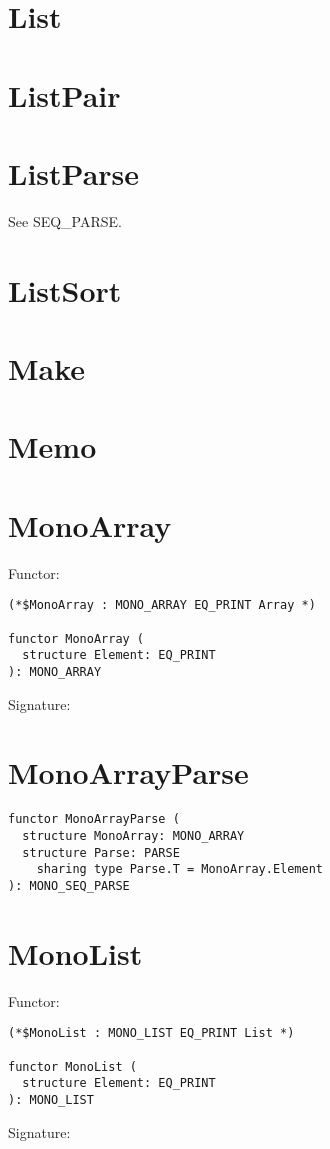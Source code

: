 \newpage
\section{List}


\newpage
\section{ListPair}


\newpage
\section{ListParse}
See SEQ\_PARSE.

\newpage
\section{ListSort}


\newpage
\section{Make}


\newpage
\section{Memo}


\newpage
\section{MonoArray}
Functor:
\begin{verbatim}
(*$MonoArray : MONO_ARRAY EQ_PRINT Array *)

functor MonoArray (
  structure Element: EQ_PRINT
): MONO_ARRAY
\end{verbatim}
\bigskip
Signature:


\newpage
\section{MonoArrayParse}
\begin{verbatim}
functor MonoArrayParse (
  structure MonoArray: MONO_ARRAY
  structure Parse: PARSE
    sharing type Parse.T = MonoArray.Element
): MONO_SEQ_PARSE
\end{verbatim}

\newpage
\section{MonoList}
Functor:
\begin{verbatim}
(*$MonoList : MONO_LIST EQ_PRINT List *)

functor MonoList (
  structure Element: EQ_PRINT
): MONO_LIST
\end{verbatim}
\bigskip
Signature:


